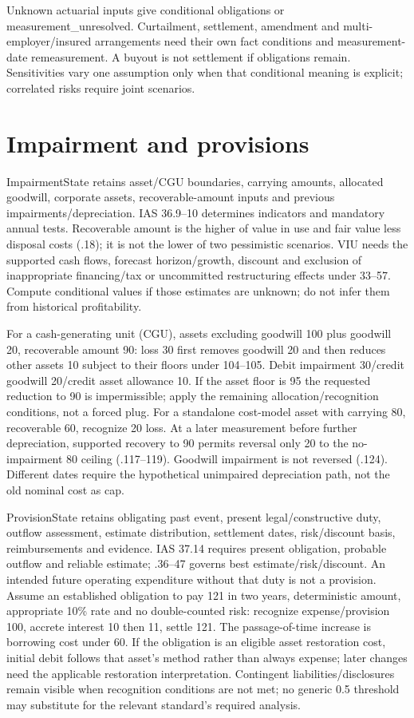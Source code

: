 Unknown actuarial inputs give conditional obligations or measurement\_unresolved. Curtailment, settlement, amendment and multi-employer/insured arrangements need their own fact conditions and measurement-date remeasurement. A buyout is not settlement if obligations remain. Sensitivities vary one assumption only when that conditional meaning is explicit; correlated risks require joint scenarios.

\hypertarget{impairment-and-provisions}{%
\section{Impairment and provisions}\label{method-corporate-extensions-impairment-and-provisions}}

ImpairmentState retains asset/CGU boundaries, carrying amounts, allocated goodwill, corporate assets, recoverable-amount inputs and previous impairments/depreciation. IAS 36.9--10 determines indicators and mandatory annual tests. Recoverable amount is the higher of value in use and fair value less disposal costs (.18); it is not the lower of two pessimistic scenarios. VIU needs the supported cash flows, forecast horizon/growth, discount and exclusion of inappropriate financing/tax or uncommitted restructuring effects under 33--57. Compute conditional values if those estimates are unknown; do not infer them from historical profitability.

For a cash-generating unit (CGU), assets excluding goodwill 100 plus goodwill 20, recoverable amount 90: loss 30 first removes goodwill 20 and then reduces other assets 10 subject to their floors under 104--105. Debit impairment 30/credit goodwill 20/credit asset allowance 10. If the asset floor is 95 the requested reduction to 90 is impermissible; apply the remaining allocation/recognition conditions, not a forced plug. For a standalone cost-model asset with carrying 80, recoverable 60, recognize 20 loss. At a later measurement before further depreciation, supported recovery to 90 permits reversal only 20 to the no-impairment 80 ceiling (.117--119). Goodwill impairment is not reversed (.124). Different dates require the hypothetical unimpaired depreciation path, not the old nominal cost as cap.

ProvisionState retains obligating past event, present legal/constructive duty, outflow assessment, estimate distribution, settlement dates, risk/discount basis, reimbursements and evidence. IAS 37.14 requires present obligation, probable outflow and reliable estimate; .36--47 governs best estimate/risk/discount. An intended future operating expenditure without that duty is not a provision. Assume an established obligation to pay 121 in two years, deterministic amount, appropriate 10\% rate and no double-counted risk: recognize expense/provision 100, accrete interest 10 then 11, settle 121. The passage-of-time increase is borrowing cost under 60. If the obligation is an eligible asset restoration cost, initial debit follows that asset's method rather than always expense; later changes need the applicable restoration interpretation. Contingent liabilities/disclosures remain visible when recognition conditions are not met; no generic 0.5 threshold may substitute for the relevant standard's required analysis.

